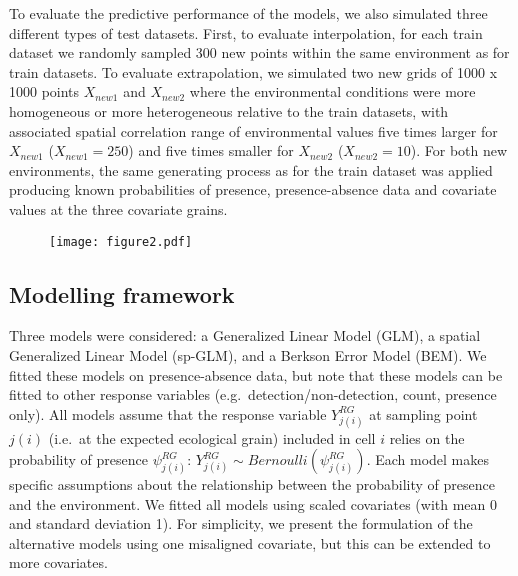 \documentclass[
  12pt,
  a4paper]{article}
\begin{document}
To evaluate the predictive performance of the models, we also simulated three different types of test datasets. First, to evaluate interpolation, for each train dataset we randomly sampled 300 new points within the same environment as for train datasets. To evaluate extrapolation, we simulated two new grids of 1000 x 1000 points \(X_{new1}\) and \(X_{new2}\) where the environmental conditions were more homogeneous or more heterogeneous relative to the train datasets, with associated spatial correlation range of environmental values five times larger for \(X_{new1}\) (\(X_{new1} = 250\)) and five times smaller for \(X_{new2}\) (\(X_{new2} = 10\)). For both new environments, the same generating process as for the train dataset was applied producing known probabilities of presence, presence-absence data and covariate values at the three covariate grains.

\begin{figure}
\texttt{[image: figure2.pdf]}  
\label{fig:fig2}
\end{figure}

\hypertarget{modelling-framework}{%
\subsection{Modelling framework}\label{modelling-framework}}

Three models were considered: a Generalized Linear Model (GLM), a spatial Generalized Linear Model (sp-GLM), and a Berkson Error Model (BEM). We fitted these models on presence-absence data, but note that these models can be fitted to other response variables (e.g.~detection/non-detection, count, presence only). All models assume that the response variable \(Y^{RG}_{j(i)}\) at sampling point \(j(i)\) (i.e.~at the expected ecological grain) included in cell \(i\) relies on the probability of presence \(\psi^{RG}_{j(i)}\): \(Y^{RG}_{j(i)} \sim Bernoulli(\psi^{RG}_{j(i)})\). Each model makes specific assumptions about the relationship between the probability of presence and the environment. We fitted all models using scaled covariates (with mean 0 and standard deviation 1). For simplicity, we present the formulation of the alternative models using one misaligned covariate, but this can be extended to more covariates.
\end{document}
